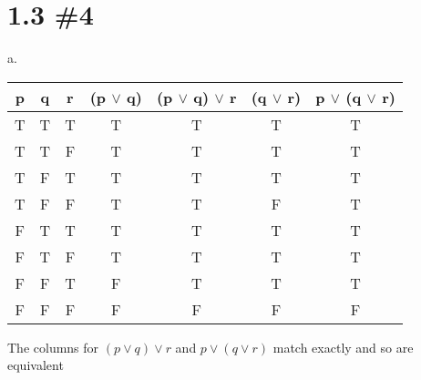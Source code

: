 \documentclass[h]{article}
\begin{document}
\section*{1.3 \#4}
a.\newline
\begin{tabular}{|c|c|c|c|c|c|c|} \hline
p & q & r & (p $\vee$ q) &(p $\vee$ q) $\vee$ r& (q $\vee$ r) & p $\vee$ (q $\vee$ r)\\ \hline
T & T & T & T & T & T & T\\ \hline
T & T & F & T & T & T & T\\ \hline
T & F & T & T & T & T & T\\ \hline
T & F & F & T & T & F & T\\ \hline
F & T & T & T & T & T & T\\ \hline
F & T & F & T & T & T & T\\ \hline
F & F & T & F & T & T & T\\ \hline
F & F & F & F & F & F & F\\ \hline

\end{tabular}\newline \newline
The columns for $(p \vee q) \vee r$ and $p \vee (q \vee r)$ match exactly and so are equivalent
\end{document}

